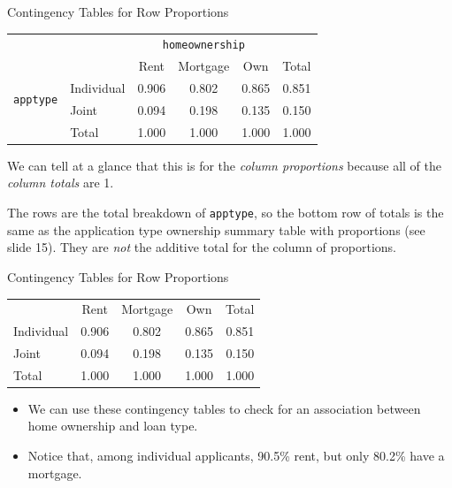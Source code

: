 \begin{frame}{Contingency Tables for Row Proportions}
    \begin{center}
        \begin{tabular}{r l ccc r}
		& & \multicolumn{3}{c}{{\texttt{homeownership}}} & \\
        \cline{3-5}
		& & Rent & Mortgage & Own & Total  \\ 
        \cline{2-6}
        \multirow{2}{*}{{\texttt{apptype}}} 
        & Individual & 0.906 & 0.802 & 0.865 & 0.851 \\ 
  		& Joint & 0.094 & 0.198 & 0.135 & 0.150 \\ 
        \cline{2-6}
  		& Total	& 1.000 & 1.000 & 1.000 & 1.000 \\
        \cline{2-6}
    \end{tabular}
    \end{center}
    We can tell at a glance that this is for the \textit{column proportions} because all of the \textit{column totals} are 1. 
    
    \vspace{12pt}The rows are the total breakdown of \texttt{apptype}, so the bottom row of totals is the same as the application type ownership summary table with proportions (see slide 15). They are \textit{not} the additive total for the column of proportions. 
\end{frame}

\begin{frame}{Contingency Tables for Row Proportions}
    \begin{center}
        \begin{tabular}{l ccc r}
		& Rent & Mortgage & Own & Total  \\ 
        \cline{2-5}
        Individual & 0.906 & 0.802 & 0.865 & 0.851 \\ 
  		Joint & 0.094 & 0.198 & 0.135 & 0.150 \\ 
        \cline{2-5}
  		Total	& 1.000 & 1.000 & 1.000 & 1.000 \\
        \cline{2-5}
    \end{tabular}
    \end{center}
    \begin{itemize}
        \item We can use these contingency tables to check for an association between home ownership and loan type.
        \item Notice that, among individual applicants, 90.5\% rent, but only 80.2\% have a mortgage.
    \end{itemize}
\end{frame}

